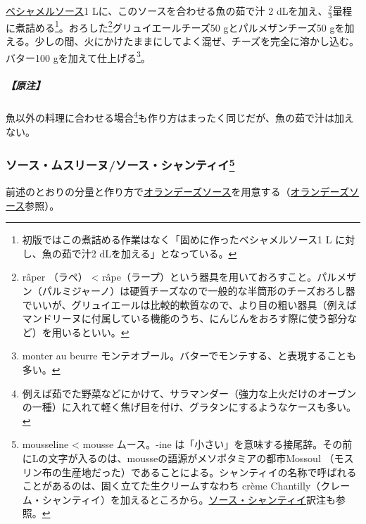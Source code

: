 \begin{recette}
\protect\hyperlink{sauce-bechamel}{ベシャメルソース}1
Lに、このソースを合わせる魚の茹で汁 2
dLを加え、\(\frac{2}{3}\)量程に煮詰める\footnote{初版ではこの煮詰める作業はなく「固めに作ったベシャメルソース1
  L に対し、魚の茹で汁2 dLを加える」となっている。}。おろした\footnote{râper
  （ラペ） \textless{}
  râpe（ラープ）という器具を用いておろすこと。パルメザン（パルミジャーノ）は硬質チーズなので一般的な半筒形のチーズおろし器でいいが、グリュイエールは比較的軟質なので、より目の粗い器具（例えばマンドリーヌに付属している機能のうち、にんじんをおろす際に使う部分など）を用いるといい。}グリュイエールチーズ50
gとパルメザンチーズ50
gを加える。少しの間、火にかけたままにしてよく混ぜ、チーズを完全に溶かし込む。バター100
gを加えて仕上げる\footnote{monter au beurre
  モンテオブール。バターでモンテする、と表現することも多い。}。

\hypertarget{nota-sauce-mornay}{%
\subparagraph{【原注】}\label{nota-sauce-mornay}}

魚以外の料理に合わせる場合\footnote{例えば茹でた野菜などにかけて、サラマンダー（強力な上火だけのオーブンの一種）に入れて軽く焦げ目を付け、グラタンにするようなケースも多い。}も作り方はまったく同じだが、魚の茹で汁は加えない。

\atoaki{}

\hypertarget{sauce-mousseline}{%
\subsubsection[ソース・ムスリーヌ/ソース・シャンティイ]{\texorpdfstring{ソース・ムスリーヌ/ソース・シャンティイ\footnote{mousseline
  \textless{} mousse ムース。-ine
  は「小さい」を意味する接尾辞。その前にLの文字が入るのは、mousseの語源がメソポタミアの都市Mossoul
  （モスリン布の生産地だった）であることによる。シャンティイの名称で呼ばれることがあるのは、固く立てた生クリームすなわち
  crème
  Chantilly（クレーム・シャンティイ）を加えるところから。\protect\hyperlink{sauce-chantilly}{ソース・シャンティイ}訳注も参照。}}{ソース・ムスリーヌ/ソース・シャンティイ}}\label{sauce-mousseline}}


 

前述のとおりの分量と作り方で\protect\hyperlink{sauce-hollandaise}{オランデーズソース}を用意する（\protect\hyperlink{sauce-hollandaise}{オランデーズソース}参照）。


\end{recette}
